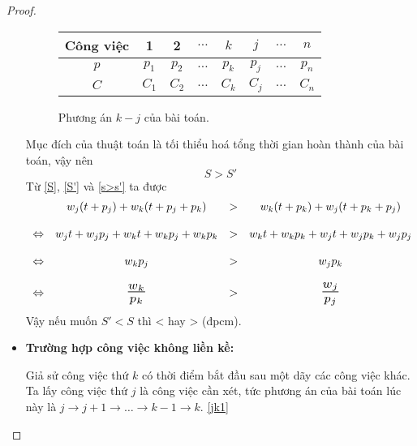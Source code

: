 \documentclass[12pt,a4paper]{report}
\begin{document}
\begin{proof}
\begin{itemize}
	\begin{figure}[h!]
		\centering
		 \begin{tabular}{|c | c c c c c c c |} 
		 \hline
		 Công việc & 1 & 2 & $\ldots$ & $k$ & $j$ & $\ldots$ & $n$ \\
		 \hline\hline
		 $p$ & $p_1$ & $p_2$ & $\ldots$ & $p_k$ & $p_j$ & $\ldots$ & $p_n$ \\
		 $C$ & $C_1$ & $C_2$ & $\ldots$ & $C_k$ & $C_j$ & $\ldots$ & $C_n$ \\
		 \hline
		 \end{tabular}
	\caption{Phương án $k - j$ của bài toán.}
	\end{figure}

	Mục đích của thuật toán là tối thiểu hoá tổng thời gian hoàn thành của bài toán, vậy nên
	\begin{equation} \label{s>s'}
		S > S'
	\end{equation}
	Từ \eqref{S}, \eqref{S'} và \eqref{s>s'} ta được
        \begin{equation*}
        \begin{array}{c c c c}
		& w_j(t+p_j) + w_k(t+p_j+p_k) &>& w_k(t+p_k) + w_j(t+p_k+p_j) \\
		\\
		\Leftrightarrow & w_jt + w_jp_j + w_kt + w_k p_j + w_kp_k &>& w_k t + w_k p_k + w_j t + w_j p_k + w_j p_j \\
		\\
		\Leftrightarrow & w_k p_j &>& w_j p_k \\
		\\
		\Leftrightarrow & \scalebox{1.5}{$\frac{w_k}{p_k}$} &>& \scalebox{1.5}{$\frac{w_j}{p_j}$} \\
        \end{array}
        \end{equation*}
		Vậy nếu muốn $S'<S$ thì  <  hay  >  (đpcm).

\phantom{text}

\item \textbf{Trường hợp công việc không liền kề:}

Giả sử công việc thứ $k$ có thời điểm bắt đầu sau một dãy các công việc khác. Ta lấy công việc thứ $j$ là công việc cần xét, tức phương án của bài toán lúc này là $j \rightarrow j+1 \rightarrow \ldots \rightarrow k-1 \rightarrow k$. \eqref{jk1}


\end{itemize}
\end{proof}
\end{document}
